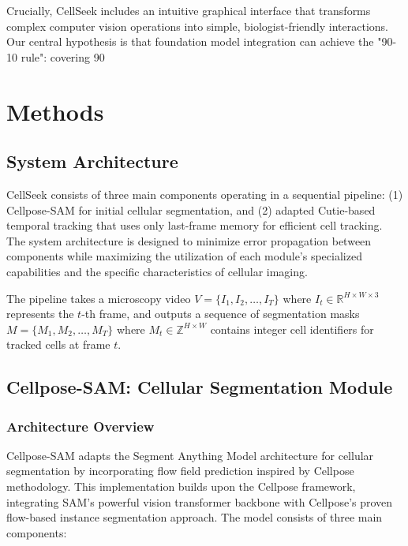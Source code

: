 \documentclass[12pt]{article}
\begin{document}
Crucially, CellSeek includes an intuitive graphical interface that transforms complex computer vision operations into simple, biologist-friendly interactions. Our central hypothesis is that foundation model integration can achieve the "90-10 rule": covering 90%

\section{Methods}

\subsection{System Architecture}

CellSeek consists of three main components operating in a sequential pipeline: (1) Cellpose-SAM for initial cellular segmentation, and (2) adapted Cutie-based temporal tracking that uses only last-frame memory for efficient cell tracking. The system architecture is designed to minimize error propagation between components while maximizing the utilization of each module's specialized capabilities and the specific characteristics of cellular imaging.

The pipeline takes a microscopy video $V = \{I_1, I_2, \ldots, I_T\}$ where $I_t \in \mathbb{R}^{H \times W \times 3}$ represents the $t$-th frame, and outputs a sequence of segmentation masks $M = \{M_1, M_2, \ldots, M_T\}$ where $M_t \in \mathbb{Z}^{H \times W}$ contains integer cell identifiers for tracked cells at frame $t$.

\subsection{Cellpose-SAM: Cellular Segmentation Module}

\subsubsection{Architecture Overview}

Cellpose-SAM adapts the Segment Anything Model architecture for cellular segmentation by incorporating flow field prediction inspired by Cellpose methodology. This implementation builds upon the Cellpose framework, integrating SAM's powerful vision transformer backbone with Cellpose's proven flow-based instance segmentation approach. The model consists of three main components:
\end{document}

